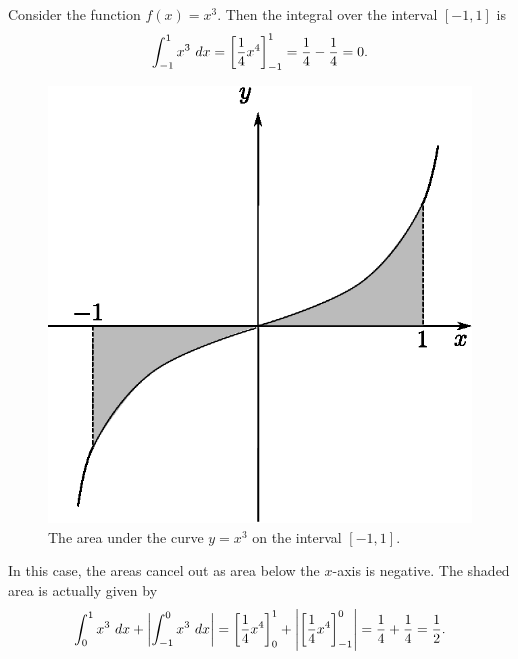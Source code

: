\begin{example}
Consider the function $f(x)=x^3$. Then the integral over the interval $[-1,1]$ is
\[\int_{-1}^1x^3\ dx=\left[\frac{1}{4}x^4\right]_{-1}^1=\frac{1}{4}-\frac{1}{4}=0.\]

\begin{figure}[H]
\centering
\includegraphics[scale=0.7]{img/integration-graph-x-cubed}
\caption{The area under the curve $y=x^3$ on the interval $[-1,1]$.}
\label{fig:integration-graph-x-cubed}
\end{figure}

In this case, the areas cancel out as area below the $x$-axis is negative. The shaded area is actually given by
\[\int_{0}^1x^3\ dx+\left|\int_{-1}^0x^3\ dx\right|=\left[\frac{1}{4}x^4\right]_0^1+\left|\left[\frac{1}{4}x^4\right]_{-1}^0\right|=\frac{1}{4}+\frac{1}{4}=\frac{1}{2}.\]
\end{example}
